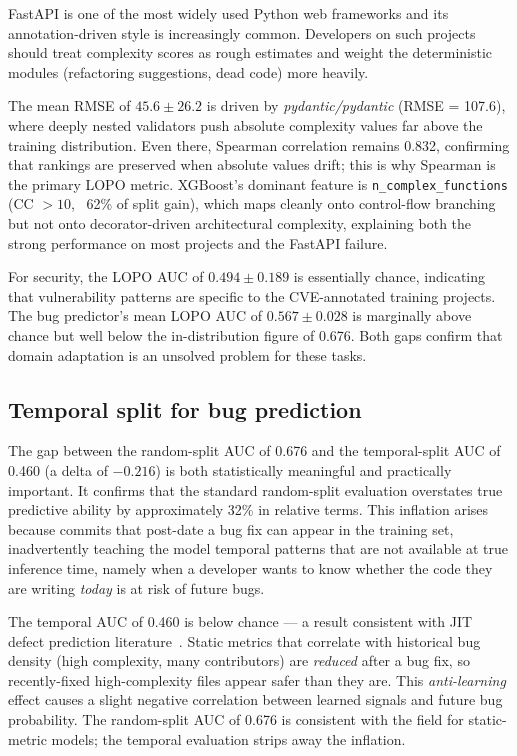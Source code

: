 \documentclass[12pt, oneside]{report}
\begin{document}
FastAPI is one of the most widely used Python web frameworks and its annotation-driven style is increasingly common. Developers on such projects should treat complexity scores as rough estimates and weight the deterministic modules (refactoring suggestions, dead code) more heavily.

The mean RMSE of $45.6 \pm 26.2$ is driven by \textit{pydantic/pydantic} (RMSE = 107.6), where deeply nested validators push absolute complexity values far above the training distribution. Even there, Spearman correlation remains 0.832, confirming that rankings are preserved when absolute values drift; this is why Spearman is the primary LOPO metric. XGBoost's dominant feature is \texttt{n\_complex\_functions} (CC $>10$, ~62\% of split gain), which maps cleanly onto control-flow branching but not onto decorator-driven architectural complexity, explaining both the strong performance on most projects and the FastAPI failure.

For security, the LOPO AUC of $0.494 \pm 0.189$ is essentially chance, indicating that vulnerability patterns are specific to the CVE-annotated training projects. The bug predictor's mean LOPO AUC of $0.567 \pm 0.028$ is marginally above chance but well below the in-distribution figure of 0.676. Both gaps confirm that domain adaptation is an unsolved problem for these tasks.

\subsection{Temporal split for bug prediction}
\label{ssec:temporal}

The gap between the random-split AUC of 0.676 and the temporal-split AUC of 0.460
(a delta of $-0.216$) is both statistically meaningful and practically important. It
confirms that the standard random-split evaluation overstates true predictive ability
by approximately 32\% in relative terms. This inflation arises because commits that
post-date a bug fix can appear in the training set, inadvertently teaching the model
temporal patterns that are not available at true inference time, namely when a developer wants to know whether the code they are writing \textit{today} is at risk of future bugs.

The temporal AUC of 0.460 is below chance — a result consistent with JIT defect prediction literature~\cite{kamei2013, d2010}. Static metrics that correlate with historical bug density (high complexity, many contributors) are \textit{reduced} after a bug fix, so recently-fixed high-complexity files appear safer than they are. This \textit{anti-learning} effect causes a slight negative correlation between learned signals and future bug probability. The random-split AUC of 0.676 is consistent with the field for static-metric models; the temporal evaluation strips away the inflation.
\end{document}
